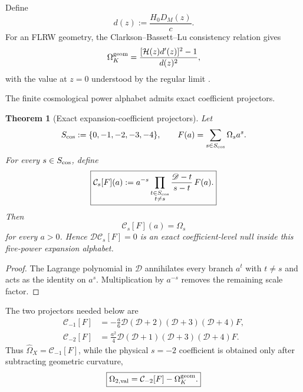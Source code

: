 \documentclass[aps,prd,preprint,onecolumn,nofootinbib,superscriptaddress,showkeys]{revtex4-2}
\numberwithin{equation}{section}
\theoremstyle{definition}
\theoremstyle{plain}
\newtheorem{theorem}{Theorem}[section]
\newcommand{\Dil}{\mathscr D}
\begin{document}
Define
\begin{equation}
d(z):=\frac{H_0D_M(z)}{c}.
\end{equation}
For an FLRW geometry, the Clarkson--Bassett--Lu consistency relation gives
\begin{equation}
\Omega_K^{\rm geom}
=
\frac{[\mathcal H(z)d'(z)]^2-1}{d(z)^2},
\end{equation}
with the value at \(z=0\) understood by the regular limit \cite{ClarksonBassettLu2008}.

The finite cosmological power alphabet admits exact coefficient projectors.

\begin{theorem}[Exact expansion-coefficient projectors]\label{thm:expansion-projectors}
Let
\begin{equation}
S_{\rm cos}:=\{0,-1,-2,-3,-4\},
\qquad
F(a)=\sum_{s\in S_{\rm cos}}\Omega_s a^s.
\end{equation}
For every \(s\in S_{\rm cos}\), define
\begin{equation}
\boxed{
\mathcal C_s[F](a)
:=
a^{-s}
\prod_{\substack{t\in S_{\rm cos}\\t\ne s}}
\frac{\Dil-t}{s-t}\,F(a).
}
\end{equation}
Then
\begin{equation}
\boxed{\mathcal C_s[F](a)=\Omega_s}
\end{equation}
for every \(a>0\).  Hence \(\Dil\mathcal C_s[F]=0\) is an exact coefficient-level null inside this five-power expansion alphabet.
\end{theorem}

\begin{proof}
The Lagrange polynomial in \(\Dil\) annihilates every branch \(a^t\) with \(t\ne s\) and acts as the identity on \(a^s\).  Multiplication by \(a^{-s}\) removes the remaining scale factor.
\end{proof}

The two projectors needed below are
\begin{align}
\mathcal C_{-1}[F]
&=-\frac a6\Dil(\Dil+2)(\Dil+3)(\Dil+4)F,\\
\mathcal C_{-2}[F]
&=\frac{a^2}{4}\Dil(\Dil+1)(\Dil+3)(\Dil+4)F.
\end{align}
Thus \(\widehat\Omega_X=\mathcal C_{-1}[F]\), while the physical \(s=-2\) coefficient is obtained only after subtracting geometric curvature,
\begin{equation}
\boxed{
\Omega_{2,\rm val}=\mathcal C_{-2}[F]-\Omega_K^{\rm geom}.
}
\end{equation}
\end{document}

